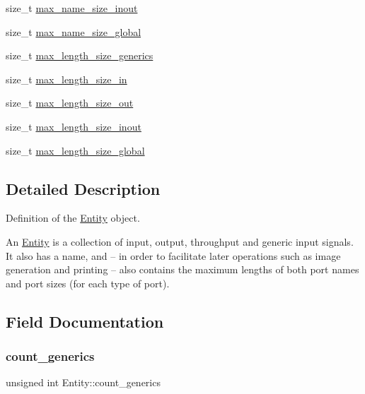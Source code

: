 \begin{DoxyCompactItemize}
\item 
size\+\_\+t \mbox{\hyperlink{struct_entity_a33a2fca24ecaee57aaf1b2416463e1bd}{max\+\_\+name\+\_\+size\+\_\+inout}}
\item 
size\+\_\+t \mbox{\hyperlink{struct_entity_a5066a9a519892bae3522583614ad4265}{max\+\_\+name\+\_\+size\+\_\+global}}
\item 
size\+\_\+t \mbox{\hyperlink{struct_entity_a9822957e550360cb5cddf1c39bb02f7c}{max\+\_\+length\+\_\+size\+\_\+generics}}
\item 
size\+\_\+t \mbox{\hyperlink{struct_entity_a3dc25f084d7d9f51ec16d4154d8d7153}{max\+\_\+length\+\_\+size\+\_\+in}}
\item 
size\+\_\+t \mbox{\hyperlink{struct_entity_aaac43fe338ec2162eb69ee47920f3363}{max\+\_\+length\+\_\+size\+\_\+out}}
\item 
size\+\_\+t \mbox{\hyperlink{struct_entity_a0833c90ebe1f08cc102e27d9a7ee87ff}{max\+\_\+length\+\_\+size\+\_\+inout}}
\item 
size\+\_\+t \mbox{\hyperlink{struct_entity_a36ae5682c01accd9d4335055ab0eca05}{max\+\_\+length\+\_\+size\+\_\+global}}
\end{DoxyCompactItemize}


\subsection{Detailed Description}
Definition of the \mbox{\hyperlink{struct_entity}{Entity}} object. 

An \mbox{\hyperlink{struct_entity}{Entity}} is a collection of input, output, throughput and generic input signals. It also has a name, and -- in order to facilitate later operations such as image generation and printing -- also contains the maximum lengths of both port names and port sizes (for each type of port). 

\subsection{Field Documentation}
\mbox{\label{struct_entity_a20a2de116010cce381f1127dae0b2218}} 
\subsubsection{\texorpdfstring{count\_generics}{count\_generics}}
{\footnotesize\ttfamily unsigned int Entity\+::count\+\_\+generics}

